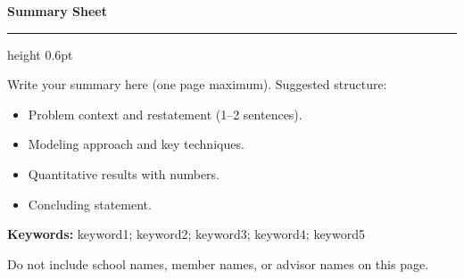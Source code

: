 \thispagestyle{empty}

\noindent
\begin{minipage}[t]{0.48\textwidth}
\end{minipage}\hfill
\begin{minipage}[t]{0.48\textwidth}
\end{minipage}

\vspace{0.65em}
\begin{center}
  {\large\bfseries Summary Sheet}\\[0.35em]
  {\bfseries\MCMTitle}
\end{center}

\vspace{0.45em}
\hrule height 0.6pt
\vspace{0.75em}

Write your summary here (one page maximum). Suggested structure:
\begin{itemize}[nosep,leftmargin=*]
  \item Problem context and restatement (1--2 sentences).
  \item Modeling approach and key techniques.
  \item Quantitative results with numbers.
  \item Concluding statement.
\end{itemize}

\vspace{0.5em}
\noindent\textbf{Keywords:} keyword1; keyword2; keyword3; keyword4; keyword5

\vfill
{\footnotesize Do not include school names, member names, or advisor names on this page.}
\clearpage
